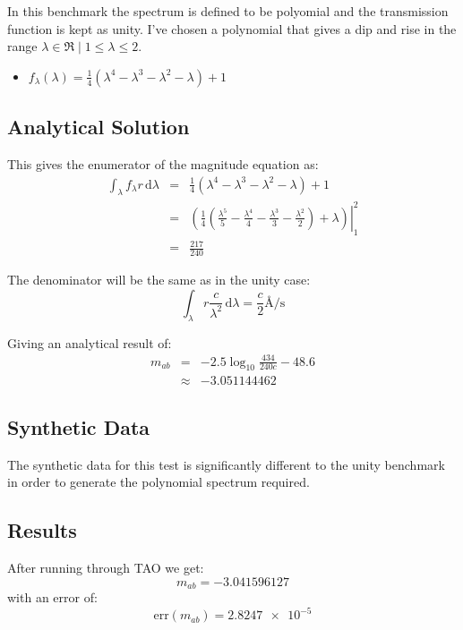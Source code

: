 \documentclass[12pt]{scrartcl}
\newcommand{\dx}[1]{\ensuremath{\,\mathrm{d}#1}}
\begin{document}
In this benchmark the spectrum is defined to be polyomial and the
transmission function is kept as unity. I've chosen a polynomial
that gives a dip and rise in the range ${\lambda \in \Re \mid 1 \leq \lambda \le 2}$.

\begin{itemize}
  \item $f_\lambda(\lambda) = \frac{1}{4}\left(
  \lambda^4 - \lambda^3 - \lambda^2 - \lambda
  \right) + 1$
\end{itemize}

\subsection{Analytical Solution}

This gives the enumerator of the magnitude equation as:
\begin{eqnarray*}
\int_\lambda f_\lambda r \dx{\lambda}
& = & \frac{1}{4}\left(
  \lambda^4 - \lambda^3 - \lambda^2 - \lambda
  \right) + 1 \\
& = & \left. \left( \frac{1}{4}\left(
  \frac{\lambda^5}{5} - \frac{\lambda^4}{4} - \frac{\lambda^3}{3} - \frac{\lambda^2}{2}
  \right) + \lambda \right) \right|_1^2 \\
& = & \frac{217}{240}
\end{eqnarray*}

The denominator will be the same as in the unity case:
\[ \int_\lambda r \frac{c}{\lambda^2} \dx{\lambda} = \frac{c}{2} \si{\angstrom\per\second} \]

Giving an analytical result of:
\begin{eqnarray*}
m_{ab} & = & -2.5\log_{10} \frac{434}{240c} - 48.6 \\
& \approx & -3.051144462
\end{eqnarray*}

\subsection{Synthetic Data}

The synthetic data for this test is significantly different to the unity
benchmark in order to generate the polynomial spectrum required.

\subsection{Results}

After running through TAO we get:
\[ m_{ab} = -3.041596127 \]
with an error of:
\[ \mathrm{err}(m_{ab}) = \num{2.8247e-5} \]
\end{document}
